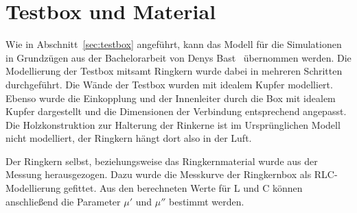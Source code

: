 \section{Testbox und Material}
Wie in Abschnitt~\ref{sec:testbox} angef\"uhrt, kann das Modell f\"ur die Simulationen in Grundz\"ugen aus der Bachelorarbeit von Denys Bast~\cite{bast2017ba} \"ubernommen werden. Die Modellierung der Testbox mitsamt Ringkern wurde dabei in mehreren Schritten durchgef\"uhrt. Die W\"ande der Testbox wurden mit idealem Kupfer modelliert. Ebenso wurde die Einkopplung und der Innenleiter durch die Box mit idealem Kupfer dargestellt und die Dimensionen der Verbindung entsprechend angepasst. Die Holzkonstruktion zur Halterung der Rinkerne ist im Urspr\"unglichen Modell nicht modelliert, der Ringkern h\"angt dort also in der Luft.
\par
Der Ringkern selbst, beziehungsweise das Ringkernmaterial wurde aus der Messung herausgezogen. Dazu wurde die Messkurve der Ringkernbox als RLC-Modellierung gefittet. Aus den berechneten Werte f\"ur L und C k\"onnen anschlie\ss{}end die Parameter $\mu'$ und $\mu''$ bestimmt werden.